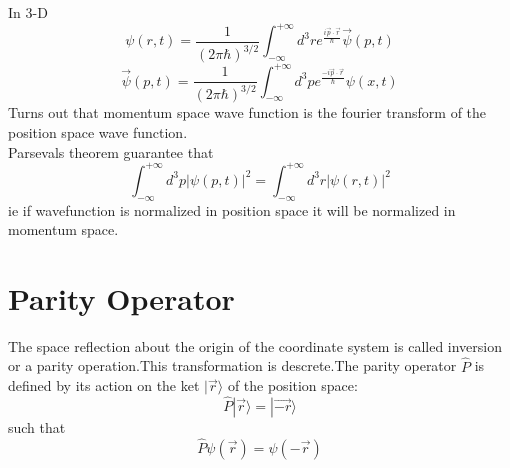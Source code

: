 In 3-D\\
$$\psi(r,t)=\frac{1}{(2\pi \hbar)^{3/2}}\int_{-\infty}^{+\infty}d^3r e^{\frac{i\vec{p}\cdot \vec{r}}{\hbar}} \vec{\psi}(p,t)$$
$$\vec{\psi}(p,t)=\frac{1}{(2\pi \hbar)^{3/2}}\int_{-\infty}^{+\infty}d^3p e^{\frac{-i\vec{p}\cdot \vec{r}}{\hbar}} \psi(x,t)$$
Turns out that momentum space wave function is the fourier transform of the position space wave function.\\
Parsevals theorem guarantee that\\
$$\int_{-\infty}^{+\infty} d^3p |\psi(p,t)|^2=\int_{-\infty}^{+\infty} d^3r |\psi(r,t)|^2$$
ie if wavefunction is normalized in position space it will be normalized in momentum space.
\section{Parity Operator}
The space reflection about the origin of the coordinate system is called inversion or a parity operation.This transformation is descrete.The parity operator $\hat{P}$ is defined by its action on the ket $|\vec{r}\rangle$ of the position space:
$$\hat{P}|\vec{r}\rangle =|\vec{-r}\rangle$$
such that 
 $$\hat{P}\psi(\vec{r})=\psi(-\vec{r})$$
